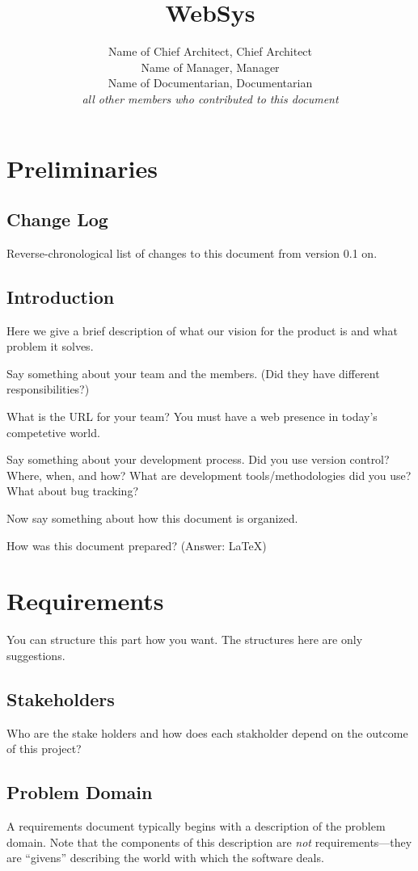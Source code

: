 \documentclass[11pt]{report}
\title{WebSys}
\author{%
  Name of Chief Architect, Chief Architect\\
  Name of Manager, Manager\\
  Name of Documentarian, Documentarian\\
  \emph{all other members who contributed to this document}
}
\begin{document}
\maketitle
\tableofcontents


\chapter{Preliminaries}

\section{Change Log}

Reverse-chronological list of changes to this document from
version 0.1 on.  

\section{Introduction}
Here we give a brief description of what our vision for the product
is and what problem it solves.

Say something about your team and the members.  (Did they have
different responsibilities?)

What is the URL for your team?  You must have a web presence in
today's competetive world.

Say something about your development process.  Did you use version
control?  Where, when, and how?  What are development
tools/methodologies did you use?  What about bug tracking?

Now say something about how this document is organized.

How was this document prepared?  (Answer: \LaTeX)


\chapter{Requirements}

You can structure this part how you want.   The structures here
are only suggestions.

\section{Stakeholders}

Who are the stake holders and how does each stakholder
depend on the outcome of this project?


\section{Problem Domain}
A requirements document typically begins with a description of the
problem domain.   Note that the components of this description
are \emph{not} requirements---they are ``givens'' describing
the world with which the software deals.
\end{document}
